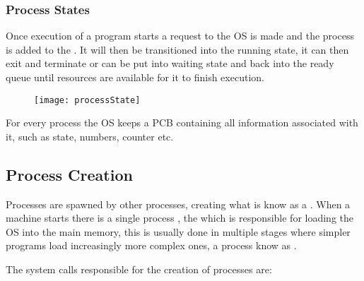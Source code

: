 	\subsubsection{Process States}


		\par{Once execution of a program starts a request to the OS is made and the process is added to the . It will then be transitioned into the running state, it can then exit and terminate or can be put into waiting state and back into the ready queue until resources are available for it to finish execution.}

	\begin{figure}[H]
		\begin{center}
		\texttt{[image: processState]}
		\end{center}
	\end{figure}


		\par{For every process the OS keeps a PCB containing all information associated with it, such as state, numbers, counter etc.}

\subsection{Process Creation}





	\par{Processes are spawned by other processes, creating what is know as a . When a machine starts there is a single process , the  which is responsible for loading the OS into the main memory, this is usually done in multiple stages where simpler programs load increasingly more complex ones, a process know as .}
	\par{The system calls responsible for the creation of processes are:}

